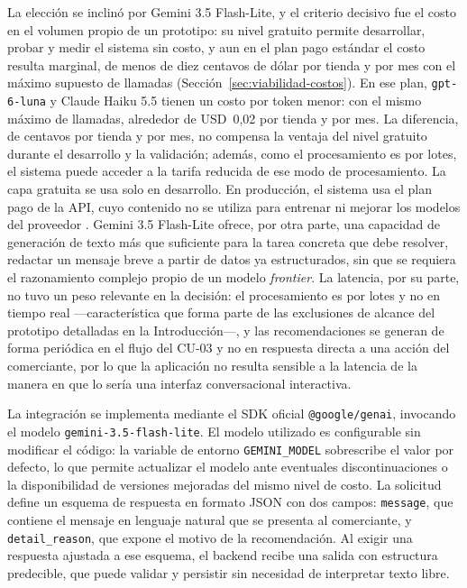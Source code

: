 La elección se inclinó por Gemini 3.5 Flash-Lite, y el criterio decisivo fue el costo en el volumen propio de un prototipo: su nivel gratuito permite desarrollar, probar y medir el sistema sin costo, y aun en el plan pago estándar el costo resulta marginal, de menos de diez centavos de dólar por tienda y por mes con el máximo supuesto de llamadas (Sección~\ref{sec:viabilidad-costos}). En ese plan, \texttt{gpt-6-luna} y Claude Haiku 5.5 tienen un costo por token menor: con el mismo máximo de llamadas, alrededor de USD~0,02 por tienda y por mes. La diferencia, de centavos por tienda y por mes, no compensa la ventaja del nivel gratuito durante el desarrollo y la validación; además, como el procesamiento es por lotes, el sistema puede acceder a la tarifa reducida de ese modo de procesamiento. La capa gratuita se usa solo en desarrollo. En producción, el sistema usa el plan pago de la API, cuyo contenido no se utiliza para entrenar ni mejorar los modelos del proveedor \parencite{GoogleGeminiTerms2026}. Gemini 3.5 Flash-Lite ofrece, por otra parte, una capacidad de generación de texto más que suficiente para la tarea concreta que debe resolver, redactar un mensaje breve a partir de datos ya estructurados, sin que se requiera el razonamiento complejo propio de un modelo \emph{frontier}. La latencia, por su parte, no tuvo un peso relevante en la decisión: el procesamiento es por lotes y no en tiempo real —característica que forma parte de las exclusiones de alcance del prototipo detalladas en la Introducción—, y las recomendaciones se generan de forma periódica en el flujo del CU-03 y no en respuesta directa a una acción del comerciante, por lo que la aplicación no resulta sensible a la latencia de la manera en que lo sería una interfaz conversacional interactiva.

La integración se implementa mediante el SDK oficial \texttt{@google/genai}, invocando el modelo \texttt{gemini-3.5-flash-lite}. El modelo utilizado es configurable sin modificar el código: la variable de entorno \texttt{GEMINI\_MODEL} sobrescribe el valor por defecto, lo que permite actualizar el modelo ante eventuales discontinuaciones o la disponibilidad de versiones mejoradas del mismo nivel de costo. La solicitud define un esquema de respuesta en formato JSON con dos campos: \texttt{message}, que contiene el mensaje en lenguaje natural que se presenta al comerciante, y \texttt{detail\_reason}, que expone el motivo de la recomendación. Al exigir una respuesta ajustada a ese esquema, el backend recibe una salida con estructura predecible, que puede validar y persistir sin necesidad de interpretar texto libre.


